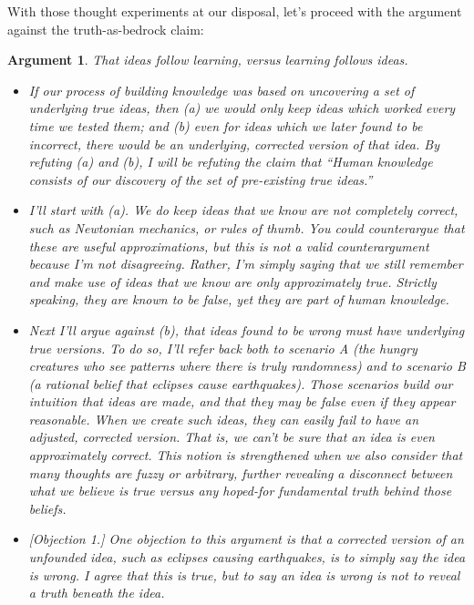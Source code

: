 \documentclass[9pt, twoside]{book}
\theoremstyle{argtstyle}
\newtheorem*{argt}{Argument}
\begin{document}
With those thought experiments at our disposal, let's proceed with
the argument against the truth-as-bedrock claim:
\begin{argt} That ideas follow learning, versus learning follows ideas.
    \label{a7}
    \normalfont
\begin{itemize}
    \item{} If our process of building knowledge was based on uncovering a set
        of underlying true ideas, then (a) we would only keep ideas which worked
        every time we tested them; and (b) even for ideas which we later found
        to be incorrect, there would be an underlying, corrected version of that
        idea. By refuting (a) and (b), I will be refuting the claim that ``Human
        knowledge consists of our discovery of the set of pre-existing true
        ideas.''

    \item{} I'll start with (a). We do keep ideas that we know are not
        completely correct, such as Newtonian mechanics, or rules of thumb.
        You could counterargue that these are useful approximations, but this is
        not a valid counterargument because I'm not disagreeing.
        Rather, I'm simply saying that we still remember and make use of ideas
        that we know are only approximately true. Strictly speaking, they are
        known to be false, yet they are part of human knowledge.
        
    \item{} Next I'll argue against (b), that ideas found to be wrong
        must have underlying true versions. To do so, I'll refer back
        both to scenario A (the hungry creatures who see patterns where there is
        truly randomness) and to scenario B (a rational belief that eclipses
        cause earthquakes).
        Those scenarios build our intuition that ideas are {\em made}, and that
        they may be false even if they appear reasonable. When we create such
        ideas, they can easily fail to have an adjusted, corrected
        version. That is, we can't be sure that an idea is
        even approximately correct. This notion is strengthened when we
        also consider that many thoughts are fuzzy or arbitrary, further
        revealing a disconnect between what we believe is true versus
        any hoped-for fundamental truth behind those beliefs.

    \item{} [Objection 1.] One objection to this argument is that a corrected
        version of an unfounded idea, such as eclipses causing earthquakes, is
        to simply say the idea is wrong. I agree that this is true, but to say an idea
        is wrong is not to reveal a truth beneath the idea.


\end{itemize}
\end{argt}
\end{document}
